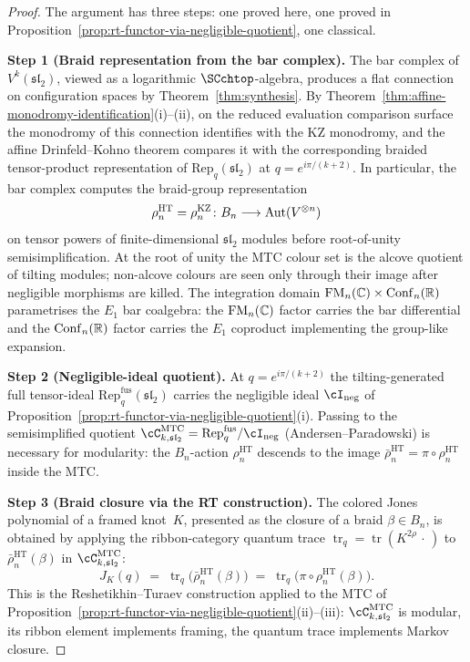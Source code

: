 \begin{proof}
The argument has three steps: one proved here, one proved in Proposition~\ref{prop:rt-functor-via-negligible-quotient}, one classical.

\medskip
\noindent\textbf{Step 1 (Braid representation from the bar complex).}
The bar complex of $V^k(\mathfrak{sl}_2)$, viewed as a logarithmic $\SCchtop$-algebra, produces a flat connection on configuration spaces by Theorem~\ref{thm:synthesis}. By Theorem~\ref{thm:affine-monodromy-identification}(i)--(ii), on the reduced evaluation comparison surface the monodromy of this connection identifies with the KZ monodromy, and the affine Drinfeld--Kohno theorem compares it with the corresponding braided tensor-product representation of $\mathrm{Rep}_q(\mathfrak{sl}_2)$ at $q = e^{i\pi/(k+2)}$. In particular, the bar complex computes the braid-group representation
\[
 \rho_n^{\mathrm{HT}} = \rho_n^{\mathrm{KZ}} \colon B_n \longrightarrow \mathrm{Aut}(V^{\otimes n})
\]
on tensor powers of finite-dimensional $\mathfrak{sl}_2$ modules before
root-of-unity semisimplification. At the root of unity the MTC colour
set is the alcove quotient of tilting modules; non-alcove colours are
seen only through their image after negligible morphisms are killed.
The integration domain $\mathrm{FM}_n(\mathbb C) \times \mathrm{Conf}_n(\mathbb R)$ parametrises
the $E_1$ bar coalgebra: the $\mathrm{FM}_n(\mathbb C)$ factor carries the bar
differential and the $\mathrm{Conf}_n(\mathbb R)$ factor carries the $E_1$ coproduct
implementing the group-like expansion.

\medskip
\noindent\textbf{Step 2 (Negligible-ideal quotient).}
At $q = e^{i\pi/(k+2)}$ the tilting-generated full tensor-ideal $\mathrm{Rep}_q^{\mathrm{fus}}(\mathfrak{sl}_2)$ carries the negligible ideal $\cI_{\mathrm{neg}}$ of Proposition~\ref{prop:rt-functor-via-negligible-quotient}(i). Passing to the semisimplified quotient $\cC^{\mathrm{MTC}}_{k,\mathfrak{sl}_2} = \mathrm{Rep}_q^{\mathrm{fus}}/\cI_{\mathrm{neg}}$ (Andersen--Paradowski) is necessary for modularity: the $B_n$-action $\rho_n^{\mathrm{HT}}$ descends to the image $\bar\rho_n^{\mathrm{HT}} = \pi \circ \rho_n^{\mathrm{HT}}$ inside the MTC.

\medskip
\noindent\textbf{Step 3 (Braid closure via the RT construction).}
The colored Jones polynomial of a framed knot~$K$, presented as the closure of a braid $\beta \in B_n$, is obtained by applying the ribbon-category quantum trace $\operatorname{tr}_q = \operatorname{tr}(K^{2\rho} \,\cdot\,)$ to $\bar\rho_n^{\mathrm{HT}}(\beta)$ in $\cC^{\mathrm{MTC}}_{k,\mathfrak{sl}_2}$:
\[
 J_K(q) \;=\; \operatorname{tr}_q\bigl(\bar\rho_n^{\mathrm{HT}}(\beta)\bigr)
 \;=\; \operatorname{tr}_q\bigl(\pi \circ \rho_n^{\mathrm{HT}}(\beta)\bigr).
\]
This is the Reshetikhin--Turaev construction \cite{RT90} applied to the MTC of Proposition~\ref{prop:rt-functor-via-negligible-quotient}(ii)--(iii): $\cC^{\mathrm{MTC}}_{k,\mathfrak{sl}_2}$ is modular, its ribbon element implements framing, the quantum trace implements Markov closure.


\end{proof}
